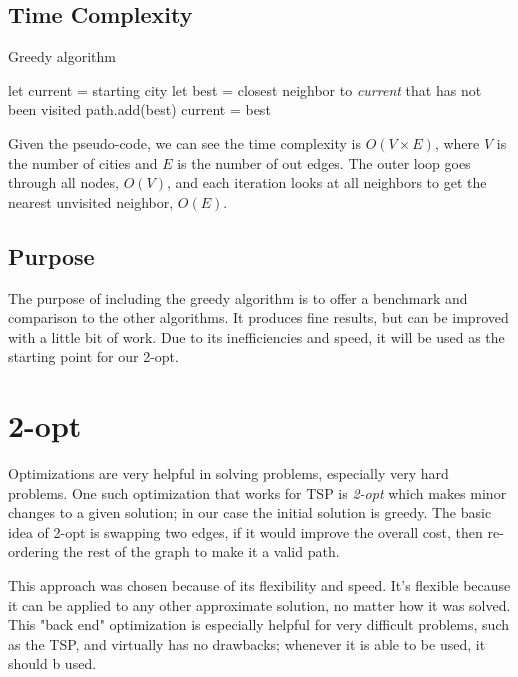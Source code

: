 \documentclass[12pt]{report}
\begin{document}
\newpage
\subsection{Time Complexity}
\begin{algorithm}
\caption{Greedy algorithm}
\label{Greedy_Alg}
\begin{algorithmic}[1]
    \State let current = starting city
    \State let best = closest neighbor to \textit{current} that has not been visited
    \State path.add(best)
    \State current = best
    \EndWhile
\EndProcedure
\end{algorithmic}
\end{algorithm}

\begin{multicols}{2}
    Given the pseudo-code, we can see the time complexity is $O(V \times E)$, where $V$ is the number of cities and $E$ is the number of out edges. The outer loop goes through all nodes, $O(V)$, and each iteration looks at all neighbors to get the nearest unvisited neighbor, $O(E)$.
    \subsection{Purpose}
    The purpose of including the greedy algorithm is to offer a benchmark and comparison to the other algorithms. It produces fine results, but can be improved with a little bit of work. Due to its inefficiencies and speed, it will be used as the starting point for our 2-opt.

    \section{2-opt}
    Optimizations are very helpful in solving problems, especially very hard problems. One such optimization that works for TSP is \textit{2-opt} which makes minor changes to a given solution; in our case the initial solution is greedy. The basic idea of 2-opt is swapping two edges, if it would improve the overall cost, then re-ordering the rest of the graph to make it a valid path.

    This approach was chosen because of its flexibility and speed. It's flexible because it can be applied to any other approximate solution, no matter how it was solved. This "back end" optimization is especially helpful for very difficult problems, such as the TSP, and virtually has no drawbacks; whenever it is able to be used, it should b used.

\end{multicols}
\end{document}

